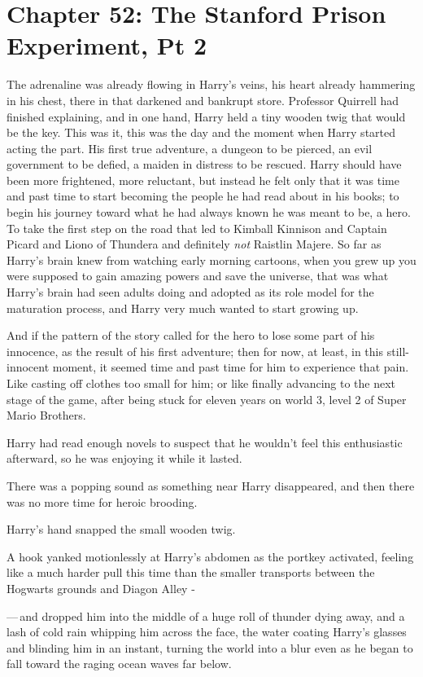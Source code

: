 \chapter{Chapter 52: The Stanford Prison Experiment, Pt 2}
The adrenaline was already flowing in Harry's veins, his heart already hammering in his chest, there in that darkened and bankrupt store. Professor Quirrell had finished explaining, and in one hand, Harry held a tiny wooden twig that would be the key. This was it, this was the day and the moment when Harry started acting the part. His first true adventure, a dungeon to be pierced, an evil government to be defied, a maiden in distress to be rescued. Harry should have been more frightened, more reluctant, but instead he felt only that it was time and past time to start becoming the people he had read about in his books; to begin his journey toward what he had always known he was meant to be, a hero. To take the first step on the road that led to Kimball Kinnison and Captain Picard and Liono of Thundera and definitely \emph{not} Raistlin Majere. So far as Harry's brain knew from watching early morning cartoons, when you grew up you were supposed to gain amazing powers and save the universe, that was what Harry's brain had seen adults doing and adopted as its role model for the maturation process, and Harry very much wanted to start growing up.

And if the pattern of the story called for the hero to lose some part of his innocence, as the result of his first adventure; then for now, at least, in this still-innocent moment, it seemed time and past time for him to experience that pain. Like casting off clothes too small for him; or like finally advancing to the next stage of the game, after being stuck for eleven years on world 3, level 2 of Super Mario Brothers.

Harry had read enough novels to suspect that he wouldn't feel this enthusiastic afterward, so he was enjoying it while it lasted.

There was a popping sound as something near Harry disappeared, and then there was no more time for heroic brooding.

Harry's hand snapped the small wooden twig.

A hook yanked motionlessly at Harry's abdomen as the portkey activated, feeling like a much harder pull this time than the smaller transports between the Hogwarts grounds and Diagon Alley -

---\,and dropped him into the middle of a huge roll of thunder dying away, and a lash of cold rain whipping him across the face, the water coating Harry's glasses and blinding him in an instant, turning the world into a blur even as he began to fall toward the raging ocean waves far below.

